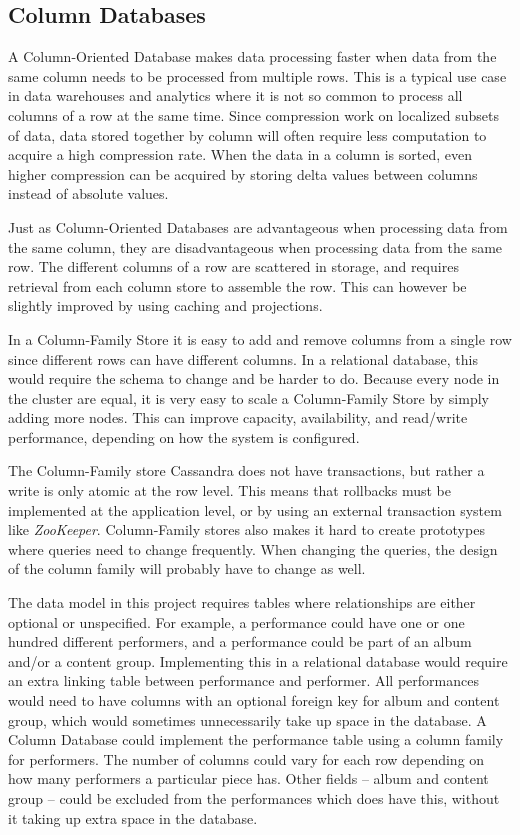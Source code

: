 \subsection{Column Databases}
\label{analysis-col-db}

A Column-Oriented Database makes data processing faster when data from the same column needs to be processed from multiple rows. This is a typical use case in data warehouses and analytics where it is not so common to process all columns of a row at the same time.
Since compression work on localized subsets of data, data stored together by column will often require less computation to acquire a high compression rate. When the data in a column is sorted, even higher compression can be acquired by storing delta values between columns instead of absolute values.

Just as Column-Oriented Databases are advantageous when processing data from the same column, they are disadvantageous when processing data from the same row. The different columns of a row are scattered in storage, and requires retrieval from each column store to assemble the row. This can however be slightly improved by using caching and projections.

In a Column-Family Store it is easy to add and remove columns from a single row since different rows can have different columns. In a relational database, this would require the schema to change and be harder to do.
Because every node in the cluster are equal, it is very easy to scale a Column-Family Store by simply adding more nodes. This can improve capacity, availability, and read/write performance, depending on how the system is configured.

The Column-Family store Cassandra does not have transactions, but rather a write is only atomic at the row level. This means that rollbacks must be implemented at the application level, or by using an external transaction system like \emph{ZooKeeper}.
Column-Family stores also makes it hard to create prototypes where queries need to change frequently. When changing the queries, the design of the column family will probably have to change as well.

The data model in this project requires tables where relationships are either optional or unspecified. For example, a performance could have one or one hundred different performers, and a performance could be part of an album and/or a content group. Implementing this in a relational database would require an extra linking table between performance and performer. All performances would need to have columns with an optional foreign key for album and content group, which would sometimes unnecessarily take up space in the database. A Column Database could implement the performance table using a column family for performers. The number of columns could vary for each row depending on how many performers a particular piece has. Other fields -- album and content group -- could be excluded from the performances which does have this, without it taking up extra space in the database.

